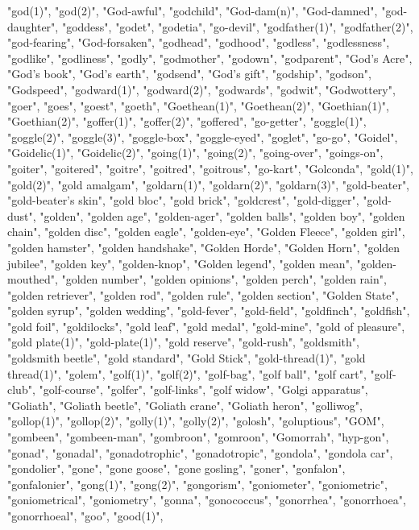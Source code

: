 "god(1)",
"god(2)",
"God-awful",
"godchild",
"God-dam(n)",
"God-damned",
"god-daughter",
"goddess",
"godet",
"godetia",
"go-devil",
"godfather(1)",
"godfather(2)",
"god-fearing",
"God-forsaken",
"godhead",
"godhood",
"godless",
"godlessness",
"godlike",
"godliness",
"godly",
"godmother",
"godown",
"godparent",
"God's Acre",
"God's book",
"God's earth",
"godsend",
"God's gift",
"godship",
"godson",
"Godspeed",
"godward(1)",
"godward(2)",
"godwards",
"godwit",
"Godwottery",
"goer",
"goes",
"goest",
"goeth",
"Goethean(1)",
"Goethean(2)",
"Goethian(1)",
"Goethian(2)",
"goffer(1)",
"goffer(2)",
"goffered",
"go-getter",
"goggle(1)",
"goggle(2)",
"goggle(3)",
"goggle-box",
"goggle-eyed",
"goglet",
"go-go",
"Goidel",
"Goidelic(1)",
"Goidelic(2)",
"going(1)",
"going(2)",
"going-over",
"goings-on",
"goiter",
"goitered",
"goitre",
"goitred",
"goitrous",
"go-kart",
"Golconda",
"gold(1)",
"gold(2)",
"gold amalgam",
"goldarn(1)",
"goldarn(2)",
"goldarn(3)",
"gold-beater",
"gold-beater's skin",
"gold bloc",
"gold brick",
"goldcrest",
"gold-digger",
"gold-dust",
"golden",
"golden age",
"golden-ager",
"golden balls",
"golden boy",
"golden chain",
"golden disc",
"golden eagle",
"golden-eye",
"Golden Fleece",
"golden girl",
"golden hamster",
"golden handshake",
"Golden Horde",
"Golden Horn",
"golden jubilee",
"golden key",
"golden-knop",
"Golden legend",
"golden mean",
"golden-mouthed",
"golden number",
"golden opinions",
"golden perch",
"golden rain",
"golden retriever",
"golden rod",
"golden rule",
"golden section",
"Golden State",
"golden syrup",
"golden wedding",
"gold-fever",
"gold-field",
"goldfinch",
"goldfish",
"gold foil",
"goldilocks",
"gold leaf",
"gold medal",
"gold-mine",
"gold of pleasure",
"gold plate(1)",
"gold-plate(1)",
"gold reserve",
"gold-rush",
"goldsmith",
"goldsmith beetle",
"gold standard",
"Gold Stick",
"gold-thread(1)",
"gold thread(1)",
"golem",
"golf(1)",
"golf(2)",
"golf-bag",
"golf ball",
"golf cart",
"golf-club",
"golf-course",
"golfer",
"golf-links",
"golf widow",
"Golgi apparatus",
"Goliath",
"Goliath beetle",
"Goliath crane",
"Goliath heron",
"golliwog",
"gollop(1)",
"gollop(2)",
"golly(1)",
"golly(2)",
"golosh",
"goluptious",
"GOM",
"gombeen",
"gombeen-man",
"gombroon",
"gomroon",
"Gomorrah",
"hyp-gon",
"gonad",
"gonadal",
"gonadotrophic",
"gonadotropic",
"gondola",
"gondola car",
"gondolier",
"gone",
"gone goose",
"gone gosling",
"goner",
"gonfalon",
"gonfalonier",
"gong(1)",
"gong(2)",
"gongorism",
"goniometer",
"goniometric",
"goniometrical",
"goniometry",
"gonna",
"gonococcus",
"gonorrhea",
"gonorrhoea",
"gonorrhoeal",
"goo",
"good(1)",
